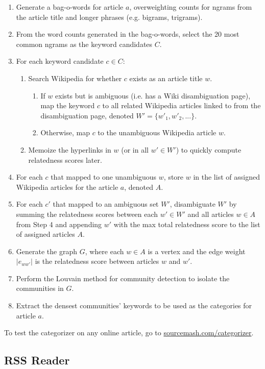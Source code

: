 \documentclass[11pt]{article}
\begin{document}
\begin{enumerate}

\item Generate a bag-o-words for article $a$, overweighting counts for ngrams from the article title and longer phrases (e.g. bigrams, trigrams).
\item From the word counts generated in the bag-o-words, select the 20 most common ngrams as the keyword candidates $C$.
\item For each keyword candidate $c \in C$:
  \begin{enumerate}
  	\item Search Wikipedia for whether $c$ exists as an article title $w$.
  	\begin{enumerate}
 		 \item If $w$ exists but is ambiguous (i.e. has a Wiki disambiguation page), map the keyword $c$ to all related Wikipedia articles linked to from the disambiguation page, denoted $W' = \{w'_{1}, w'_{2}, ...\}$.
  		\item Otherwise, map $c$ to the unambiguous Wikipedia article $w$.
  	\end{enumerate}
	\item Memoize the hyperlinks in $w$ (or in all $w' \in W'$) to quickly compute relatedness scores later.
  \end{enumerate}
\item For each $c$ that mapped to one unambiguous $w$, store $w$ in the list of assigned Wikipedia articles for the article $a$, denoted $A$.
\item For each $c'$ that mapped to an ambiguous set $W'$, disambiguate $W'$ by summing the relatedness scores between each $w' \in W'$ and all articles $w \in A$ from Step 4 and appending $w'$ with the max total relatedness score to the list of assigned articles $A$.
\item Generate the graph $G$, where each $w \in A$ is a vertex and the edge weight $|e_{ww'}|$ is the relatedness score between articles $w$ and $w'$.
\item Perform the Louvain method for community detection\cite{Blondel} to isolate the communities in $G$.
\item Extract the densest communities' keywords to be used as the categories for article $a$.
\end{enumerate}

To test the categorizer on any online article, go to \url{sourcemash.com/categorizer}.

\subsection{RSS Reader}
\end{document}
